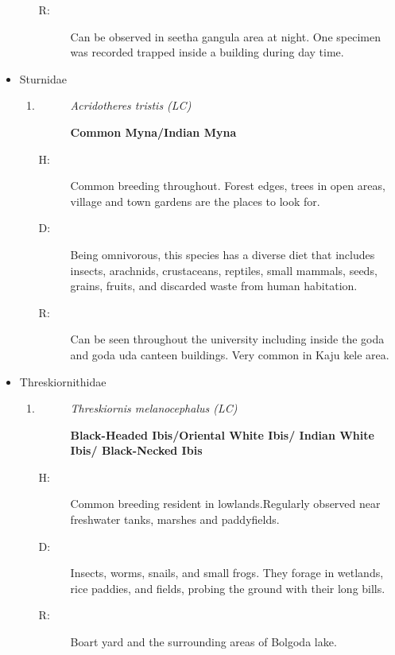 \begin{itemize}
\begin{enumerate}
\begin{description}
\item[R: ]%
Can be observed in seetha gangula area at night. One specimen was recorded trapped inside a building during day time.%
\end{description}%
\end{enumerate}%
\item%
Sturnidae%
\begin{enumerate}%
\item%
\begin{description}%
\item[]%
\textit{Acridotheres tristis (LC)}%
\item[]%
\textbf{Common Myna/Indian Myna}%
\end{description}%
\begin{description}%
\item[H: ]%
Common breeding throughout. Forest edges, trees in open areas, village and town gardens are the places to look for. %
\item[D: ]%
Being omnivorous, this species has a diverse diet that includes insects, arachnids, crustaceans, reptiles, small mammals, seeds, grains, fruits, and discarded waste from human habitation.%
\item[R: ]%
Can be seen throughout the university including inside the goda and goda uda canteen buildings. Very common in Kaju kele area.%
\end{description}%
\end{enumerate}%
\item%
Threskiornithidae%
\begin{enumerate}%
\item%
\begin{description}%
\item[]%
\textit{Threskiornis melanocephalus (LC)}%
\item[]%
\textbf{Black{-}Headed Ibis/Oriental White Ibis/ Indian White Ibis/ Black{-}Necked Ibis}%
\end{description}%
\begin{description}%
\item[H: ]%
Common breeding resident in lowlands.Regularly observed near freshwater tanks, marshes and paddyfields.%
\item[D: ]%
Insects, worms, snails, and small frogs. They forage in wetlands, rice paddies, and fields, probing the ground with their long bills.%
\item[R: ]%
Boart yard and the surrounding areas of Bolgoda lake.%
\end{description}%

\end{enumerate}
\end{itemize}
